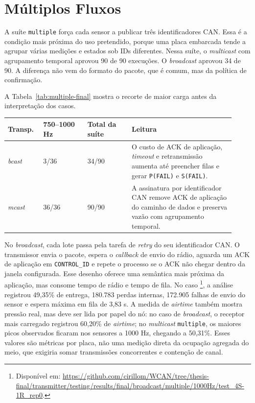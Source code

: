\section{Múltiplos Fluxos}

A suíte \texttt{multiple} força cada sensor a publicar três identificadores CAN. Essa é a
condição mais próxima do uso pretendido, porque uma placa embarcada tende a
agrupar várias medições e estados sob IDs diferentes. Nessa suíte, o \emph{multicast}
com agrupamento temporal aprovou 90 de 90 execuções. O \emph{broadcast} aprovou 34 de 90.
A diferença não vem do formato do pacote, que é comum, mas da política de
confirmação.

A Tabela~\ref{tab:multiple-final} mostra o recorte de maior carga antes da
interpretação dos casos.

\begin{center}
\small
\setlength{\tabcolsep}{5pt}
\renewcommand{\arraystretch}{1.12}
\begin{tabular}{p{0.14\linewidth}|p{0.18\linewidth}|p{0.18\linewidth}|p{0.42\linewidth}}
\hline
Transp. & 750--1000 Hz & Total da suíte & Leitura \\
\hline
\emph{bcast} & 3/36 & 34/90 & O custo de ACK de aplicação, \emph{timeout} e retransmissão aumenta até preencher filas e gerar \texttt{P(FAIL)} e \texttt{S(FAIL)}. \\
\hline
\emph{mcast} & 36/36 & 90/90 & A assinatura por identificador CAN remove ACK de aplicação do caminho de dados e preserva vazão com agrupamento temporal. \\
\hline
\end{tabular}
\label{tab:multiple-final}
\end{center}

No \emph{broadcast}, cada lote passa pela tarefa de \emph{retry} do seu identificador CAN. O transmissor
envia o pacote, espera o \emph{callback} de envio do rádio, aguarda um ACK de aplicação
em \texttt{CONTROL\_ID} e repete o processo se o ACK não chegar dentro da janela
configurada. Esse desenho oferece uma semântica mais próxima da aplicação, mas
consome tempo de rádio e tempo de fila. No caso
\footnote{Disponível em: \url{https://github.com/cirillom/WCAN/tree/thesis-final/transmitter/testing/results/final/broadcast/multiple/1000Hz/test_4S-1R_rep0}.}, a análise registrou 49,35\%
de entrega, 180.783 perdas internas, 172.905 falhas de envio do sensor e espera
máxima em fila de 3,83 s. A medida de \emph{airtime} também mostra pressão real,
mas deve ser lida por papel do nó: no caso de \emph{broadcast}, o receptor mais
carregado registrou 60,20\% de \emph{airtime}; no \emph{multicast} \texttt{multiple},
os maiores picos observados ficaram nos sensores a 1000 Hz, chegando a 50,31\%.
Esses valores são métricas por placa, não uma medição direta da ocupação agregada
do meio, que exigiria somar transmissões concorrentes e contenção de canal.

